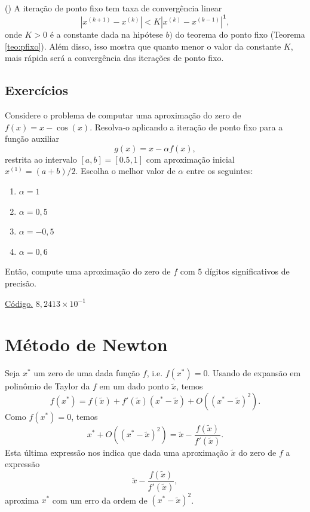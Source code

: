 \begin{obs}()
  A iteração de ponto fixo tem taxa de convergência linear
  \begin{equation}
    |x^{(k+1)} - x^{(k)}| < K|x^{(k)} - x^{(k-1)}|^{\pmb{1}},
  \end{equation}
onde $K > 0$ é a constante dada na hipótese $b)$ do teorema do ponto fixo (Teorema \ref{teo:pfixo}). Além disso, isso mostra que quanto menor o valor da constante $K$, mais rápida será a convergência das iterações de ponto fixo.
\end{obs}

\subsection*{Exercícios}

\begin{exer}\label{exer:pfixo_1}
  Considere o problema de computar uma aproximação do zero de $f(x)=x-\cos(x)$. Resolva-o aplicando a iteração de ponto fixo para a função auxiliar
  \begin{equation}
    g(x) = x - \alpha f(x),
  \end{equation}
restrita ao intervalo $[a, b] = [0.5, 1]$ com aproximação inicial $x^{(1)}=(a+b)/2$. Escolha o melhor valor de $\alpha$ entre os seguintes:
\begin{enumerate}
\item $\alpha = 1$
\item $\alpha = 0,5$
\item $\alpha = -0,5$
\item $\alpha = 0,6$
\end{enumerate}
Então, compute uma aproximação do zero de $f$ com $5$ dígitos significativos de precisão.
\end{exer}
\begin{resp}
  \ifisoctave 
  \href{https://github.com/phkonzen/notas/blob/master/src/MatematicaNumerica/cap_eq1d/dados/exer_pfixo_1/exer_pfixo_1.m}{Código.} 
  \fi
  $8,2413\times 10^{-1}$
\end{resp}

\section{Método de Newton}\label{cap_mef1d_sec_newton}

Seja $x^*$ um zero de uma dada função $f$, i.e. $f(x^*)=0$. Usando de expansão em polinômio de Taylor da $f$ em um dado ponto $\tilde{x}$, temos
\begin{equation}
  f(x^*) = f(\tilde{x}) + f'(\tilde{x})(x^*-\tilde{x}) + O((x^*-\tilde{x})^2).
\end{equation}
Como $f(x^*)=0$, temos
\begin{equation}
  x^* + O((x^*-\tilde{x})^2) = \tilde{x} - \frac{f(\tilde{x})}{f'(\tilde{x})}.
\end{equation}
Esta última expressão nos indica que dada uma aproximação $\tilde{x}$ do zero de $f$ a expressão
\begin{equation}
  \tilde{x} - \frac{f(\tilde{x})}{f'(\tilde{x})},
\end{equation}
aproxima $x^*$ com um erro da ordem de $(x^*-\tilde{x})^2$.

